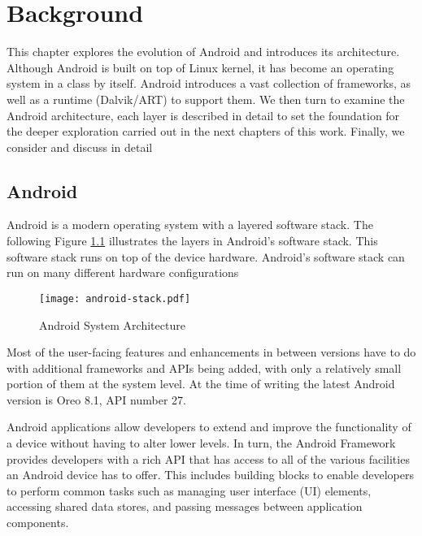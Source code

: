 \chapter{Background}

This chapter explores the evolution of Android and introduces its architecture. Although Android is built on top of Linux kernel, it has become an operating system in a class by itself. Android introduces a vast collection of frameworks, as well as a runtime (Dalvik/ART) to support them. We then turn to examine the Android architecture, each layer is described in detail to set the foundation for the deeper exploration carried out in the next chapters of this work. Finally, we consider and discuss in detail 

\section{Android}


Android is a modern operating system with a layered software stack. The following Figure \ref{fig:androidsys} illustrates the layers in Android's software stack. This software stack runs on top of the device hardware. Android's software stack can run on many different hardware configurations

\begin{figure}[H]
\centering
\texttt{[image: android-stack.pdf]}
\caption{Android System Architecture}
\label{fig:androidsys}
\end{figure}

Most of the user-facing features and enhancements in between versions have to do with additional frameworks and APIs being added, with only a relatively small portion of them at the system level. At the time of writing the latest Android version is Oreo 8.1, API number 27. 

Android applications allow developers to extend and improve the functionality of a device without having to alter lower levels. In turn, the Android Framework provides developers with a rich API that has access to all of the various facilities an Android device has to offer. This includes building blocks to enable developers to perform common tasks such as managing user interface (UI) elements, accessing shared data stores, and passing messages between application components.

